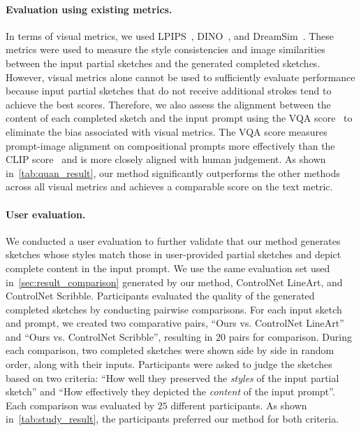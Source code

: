 \paragraph{Evaluation using existing metrics.}
In terms of visual metrics, we used LPIPS~\cite{zhang2018perceptual}, DINO~\cite{caron2021emerging}, and DreamSim~\cite{fu2023dreamsim}.
These metrics were used to measure the style consistencies and image similarities between the input partial sketches and the generated completed sketches.
However, visual metrics alone cannot be used to sufficiently evaluate performance because input partial sketches that do not receive additional strokes tend to achieve the best scores.
Therefore, we also assess the alignment between the content of each completed sketch and the input prompt using the VQA score~\cite{lin2024evaluating} to eliminate the bias associated with visual metrics.
The VQA score measures prompt-image alignment on compositional prompts more effectively than the CLIP score~\cite{radford2021learning} and is more closely aligned with human judgement.
As shown in~\cref{tab:quan_result}, our method significantly outperforms the other methods across all visual metrics and achieves a comparable score on the text metric.

\paragraph{User evaluation.}
We conducted a user evaluation to further validate that our method generates sketches whose styles match those in user-provided partial sketches and depict complete content in the input prompt.
We use the same evaluation set used in~\cref{sec:result_comparison} generated by our method, ControlNet LineArt, and ControlNet Scribble.
Participants evaluated the quality of the generated completed sketches by conducting pairwise comparisons.
For each input sketch and prompt, we created two comparative pairs, ``Ours vs. ControlNet LineArt'' and ``Ours vs. ControlNet Scribble'', resulting in $20$ pairs for comparison.
During each comparison, two completed sketches were shown side by side in random order, along with their inputs.
Participants were asked to judge the sketches based on two criteria: ``How well they preserved the \textit{styles} of the input partial sketch'' and ``How effectively they depicted the \textit{content} of the input prompt''.
Each comparison was evaluated by $25$ different participants.
As shown in~\mbox{\cref{tab:study_result}}, the participants preferred our method for both criteria.







